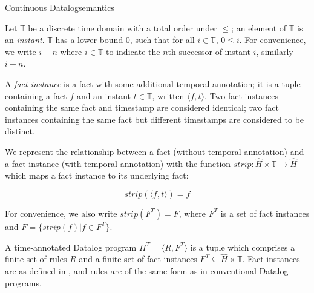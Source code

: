 \begin{nestedsection}{Continuous Datalog}{semantics}
\begin{definition}

Let $\mathbb{T}$ be a discrete time domain with a total order under
$\leqslant$; an element of $\mathbb{T}$ is an {\em instant}.
$\mathbb{T}$ has a lower bound $0$, such that for all $i \in
\mathbb{T}$, $0 \leqslant i$. For convenience, we write $i+n$ where $i
\in \mathbb{T}$ to indicate the $n$th successor of instant $i$,
similarly $i-n$.

\end{definition}

\begin{definition}

A {\em fact instance} is a fact with some additional temporal
annotation; it is a tuple containing a fact $f$ and an instant $t \in
\mathbb{T}$, written $\langle f, t \rangle$. Two fact instances
containing the same fact and timestamp are considered identical; two
fact instances containing the same fact but different timestamps are
considered to be distinct.

We represent the relationship between a fact (without temporal
annotation) and a fact instance (with temporal annotation) with the
function ${strip : \hat{H} \times \mathbb{T} \rightarrow \hat{H}}$
which maps a fact instance to its underlying fact:

\[ strip(\langle f, t\rangle) = f \]

For convenience, we also write $strip(F^T) = F$, where $F^T$ is a set
of fact instances and $F = \{ strip(f) | f \in F^T \}$.

\end{definition}

\begin{definition}

A time-annotated Datalog program $\Pi^T = \langle R, F^T\rangle$ is a
tuple which comprises a finite set of rules $R$ and a finite set of
fact instances $F^T \subseteq \hat{H} \times \mathbb{T}$. Fact
instances are as defined in , and rules are of the same form as in conventional
Datalog programs.


\end{definition}
\end{nestedsection}

